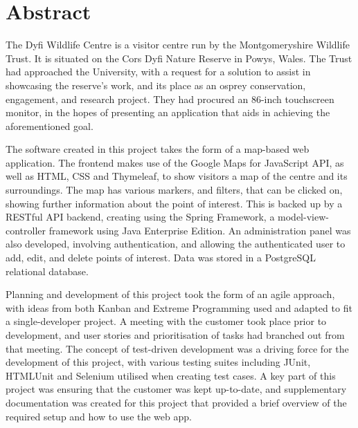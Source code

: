\thispagestyle{empty}


\section*{\centering Abstract}

The Dyfi Wildlife Centre is a visitor centre run by the Montgomeryshire Wildlife Trust. It is situated on the Cors Dyfi Nature Reserve in Powys, Wales. The Trust had approached the University, with a request for a solution to assist in showcasing the reserve's work, and its place as an osprey conservation, engagement, and research project. They had procured an 86-inch touchscreen monitor, in the hopes of presenting an application that aids in achieving the aforementioned goal.

The software created in this project takes the form of a map-based web application. The frontend makes use of the Google Maps for JavaScript API, as well as HTML, CSS and Thymeleaf, to show visitors a map of the centre and its surroundings. The map has various markers, and filters, that can be clicked on, showing further information about the point of interest. This is backed up by a RESTful API backend, creating using the Spring Framework, a model-view-controller framework using Java Enterprise Edition. An administration panel was also developed, involving authentication, and allowing the authenticated user to add, edit, and delete points of interest. Data was stored in a PostgreSQL relational database.

Planning and development of this project took the form of an agile approach, with ideas from both Kanban and Extreme Programming used and adapted to fit a single-developer project. A meeting with the customer took place prior to development, and user stories and prioritisation of tasks had branched out from that meeting. The concept of test-driven development was a driving force for the development of this project, with various testing suites including JUnit, HTMLUnit and Selenium utilised when creating test cases. A key part of this project was ensuring that the customer was kept up-to-date, and supplementary documentation was created for this project that provided a brief overview of the required setup and how to use the web app.



